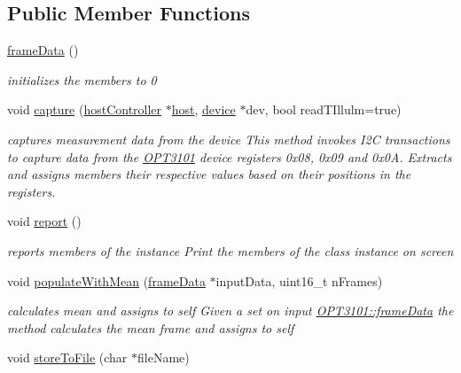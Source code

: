 \subsection*{Public Member Functions}
\begin{DoxyCompactItemize}
\item 
\mbox{\hyperlink{class_o_p_t3101_1_1frame_data_a75a43907483d7d3b2db46cfb10bfd568}{frame\+Data}} ()
\begin{DoxyCompactList}\small\item\em initializes the members to 0 \end{DoxyCompactList}\item 
void \mbox{\hyperlink{class_o_p_t3101_1_1frame_data_a0ea9d9f3fc2d25e28e77855f4db8e2a6}{capture}} (\mbox{\hyperlink{classhost_controller}{host\+Controller}} $\ast$\mbox{\hyperlink{host_controller_8h_a47f8cbf152e48aa4fdb624be57a9a856}{host}}, \mbox{\hyperlink{class_o_p_t3101_1_1device}{device}} $\ast$dev, bool read\+T\+Illulm=true)
\begin{DoxyCompactList}\small\item\em captures measurement data from the device This method invokes I2C transactions to capture data from the \mbox{\hyperlink{namespace_o_p_t3101}{O\+P\+T3101}} device registers 0x08, 0x09 and 0x0A. Extracts and assigns members their respective values based on their positions in the registers. \end{DoxyCompactList}\item 
void \mbox{\hyperlink{class_o_p_t3101_1_1frame_data_ad20da1bc47279244384f59c2f3b33d61}{report}} ()
\begin{DoxyCompactList}\small\item\em reports members of the instance Print the members of the class instance on screen \end{DoxyCompactList}\item 
void \mbox{\hyperlink{class_o_p_t3101_1_1frame_data_a2fe90347589e7c97cc9fade2c68fa10f}{populate\+With\+Mean}} (\mbox{\hyperlink{class_o_p_t3101_1_1frame_data}{frame\+Data}} $\ast$input\+Data, uint16\+\_\+t n\+Frames)
\begin{DoxyCompactList}\small\item\em calculates mean and assigns to self Given a set on input \mbox{\hyperlink{class_o_p_t3101_1_1frame_data}{O\+P\+T3101\+::frame\+Data}} the method calculates the mean frame and assigns to self \end{DoxyCompactList}\item 
void \mbox{\hyperlink{class_o_p_t3101_1_1frame_data_a8ece44f845216c8d0cae378932c854e6}{store\+To\+File}} (char $\ast$file\+Name)

\end{DoxyCompactItemize}
